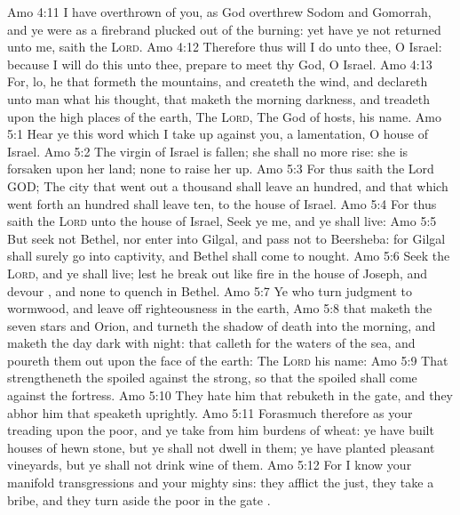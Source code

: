 \vs Amo 4:11 I have overthrown  of you, as God overthrew Sodom and Gomorrah, and ye were as a firebrand plucked out of the burning: yet have ye not returned unto me, saith the \textsc{Lord}.
\vs Amo 4:12 Therefore thus will I do unto thee, O Israel:  because I will do this unto thee, prepare to meet thy God, O Israel.
\vs Amo 4:13 For, lo, he that formeth the mountains, and createth the wind, and declareth unto man what  his thought, that maketh the morning darkness, and treadeth upon the high places of the earth, The \textsc{Lord}, The God of hosts,  his name.
\vs Amo 5:1 Hear ye this word which I take up against you,  a lamentation, O house of Israel.
\vs Amo 5:2 The virgin of Israel is fallen; she shall no more rise: she is forsaken upon her land;  none to raise her up.
\vs Amo 5:3 For thus saith the Lord GOD; The city that went out  a thousand shall leave an hundred, and that which went forth  an hundred shall leave ten, to the house of Israel.
\vs Amo 5:4 For thus saith the \textsc{Lord} unto the house of Israel, Seek ye me, and ye shall live:
\vs Amo 5:5 But seek not Bethel, nor enter into Gilgal, and pass not to Beersheba: for Gilgal shall surely go into captivity, and Bethel shall come to nought.
\vs Amo 5:6 Seek the \textsc{Lord}, and ye shall live; lest he break out like fire in the house of Joseph, and devour , and  none to quench  in Bethel.
\vs Amo 5:7 Ye who turn judgment to wormwood, and leave off righteousness in the earth,
\vs Amo 5:8  that maketh the seven stars and Orion, and turneth the shadow of death into the morning, and maketh the day dark with night: that calleth for the waters of the sea, and poureth them out upon the face of the earth: The \textsc{Lord}  his name:
\vs Amo 5:9 That strengtheneth the spoiled against the strong, so that the spoiled shall come against the fortress.
\vs Amo 5:10 They hate him that rebuketh in the gate, and they abhor him that speaketh uprightly.
\vs Amo 5:11 Forasmuch therefore as your treading  upon the poor, and ye take from him burdens of wheat: ye have built houses of hewn stone, but ye shall not dwell in them; ye have planted pleasant vineyards, but ye shall not drink wine of them.
\vs Amo 5:12 For I know your manifold transgressions and your mighty sins: they afflict the just, they take a bribe, and they turn aside the poor in the gate .
